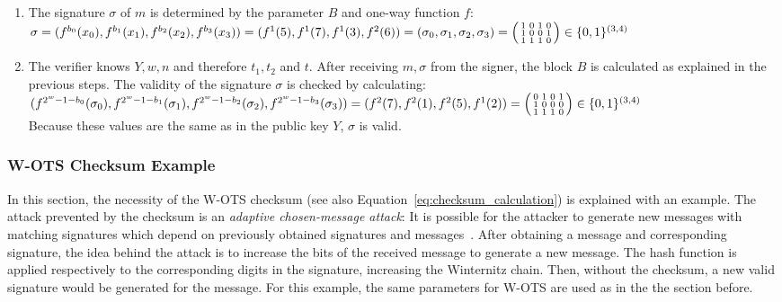 \begin{enumerate}
\item %
The signature $\sigma$ of $m$ is determined by the parameter $B$ and one-way function $f$: \\ %
$\sigma = (f^{b_0}(x_0), f^{b_1}(x_1),f^{b_2}(x_2),f^{b_3}(x_3)) = (f^1(5),f^1(7),f^1(3),f^2(6)) = (\sigma_0, \sigma_1, \sigma_2, \sigma_3) = 
\begin{psmallmatrix}
1 & 0 & 1 & 0 \\
1 & 0 & 0 & 1 \\
1 & 1 & 1 & 0
\end{psmallmatrix} \in \{0,1\}^{(3,4)} $

\item The verifier knows $Y, w, n$ and therefore $t_1, t_2$ and $t$. After receiving $m, \sigma$ from the signer, the block $B$ is calculated as explained in the previous steps. The validity of the signature $\sigma$ is checked by calculating: \\
$( f^{2^w-1-b_0}(\sigma_0), f^{2^w-1-b_1}(\sigma_1), f^{2^w-1-b_2}(\sigma_2), f^{2^w-1-b_3}(\sigma_3)) = (f^2(7) , f^2(1), f^2(5), f^1(2)) = \begin{psmallmatrix}
0 & 1 & 0 & 1 \\
1 & 0 & 0 & 0 \\
1 & 1 & 1 & 0
\end{psmallmatrix} \in \{0,1\}^{(3,4)} $
\\ Because these values are the same as in the public key $Y$, $\sigma$ is valid. 

\end{enumerate}

\subsubsection{W-OTS Checksum Example}
\label{sec:checksum_explained}
In this section, the necessity of the W-OTS checksum (see also Equation~\ref{eq:checksum_calculation}) is explained with an example. 
The attack prevented by the checksum is an \textit{adaptive chosen-message attack}: It is possible for the attacker to generate new messages with matching signatures which depend on previously obtained signatures and messages~\cite{cha:bg_signature_schemes_book_menezes2018_1997}. 
After obtaining a message and corresponding signature, the idea behind the attack is to increase the bits of the received message to generate a new message. The hash function is applied respectively to the corresponding digits in the signature, increasing the Winternitz chain. Then, without the checksum, a new valid signature would be generated for the message. For this example, the same parameters for W-OTS are used as in the the section before. %

